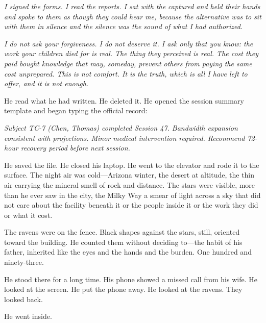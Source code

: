 \textit{I signed the forms. I read the reports. I sat with the captured and held their hands and spoke to them as though they could hear me, because the alternative was to sit with them in silence and the silence was the sound of what I had authorized.}

\textit{I do not ask your forgiveness. I do not deserve it. I ask only that you know: the work your children died for is real. The thing they perceived is real. The cost they paid bought knowledge that may, someday, prevent others from paying the same cost unprepared. This is not comfort. It is the truth, which is all I have left to offer, and it is not enough.}

He read what he had written. He deleted it. He opened the session summary template and began typing the official record:

\textit{Subject TC-7 (Chen, Thomas) completed Session 47. Bandwidth expansion consistent with projections. Minor medical intervention required. Recommend 72-hour recovery period before next session.}

He saved the file. He closed his laptop. He went to the elevator and rode it to the surface. The night air was cold---Arizona winter, the desert at altitude, the thin air carrying the mineral smell of rock and distance. The stars were visible, more than he ever saw in the city, the Milky Way a smear of light across a sky that did not care about the facility beneath it or the people inside it or the work they did or what it cost.

The ravens were on the fence. Black shapes against the stars, still, oriented toward the building. He counted them without deciding to---the habit of his father, inherited like the eyes and the hands and the burden. One hundred and ninety-three.

He stood there for a long time. His phone showed a missed call from his wife. He looked at the screen. He put the phone away. He looked at the ravens. They looked back.

He went inside.
